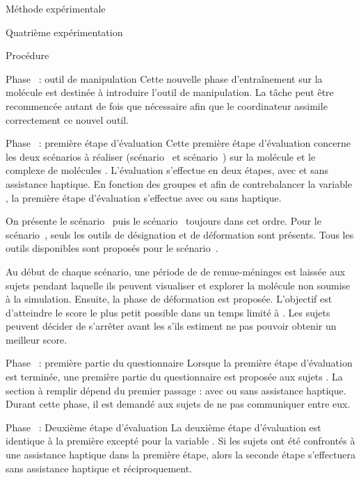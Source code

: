 \documentclass[myfrancais]{mythesis}
\begin{document}
\begin{mychapter}{Méthode expérimentale}
\begin{mysection}{Quatrième expérimentation}
\begin{mysubsection}{Procédure}
\begin{myparagraph}{Phase~ : outil de manipulation}
					Cette nouvelle phase d'entraînement sur la molécule \myTRPZIPPER est destinée à introduire l'outil de manipulation.
					La tâche peut être recommencée autant de fois que nécessaire afin que le coordinateur assimile correctement ce nouvel outil.
				\end{myparagraph}
				\begin{myparagraph}{Phase~ : première étape d'évaluation}
					Cette première étape d'évaluation concerne les deux scénarios à réaliser (scénario~ et scénario~) sur la molécule \myUbiquitin et le complexe de molécules \myNusENusG.
					L'évaluation s'effectue en deux étapes, avec et sans assistance haptique.
					En fonction des groupes et afin de contrebalancer la variable , la première étape d'évaluation s'effectue avec ou sans haptique.

					On présente le scénario~ puis le scénario~ toujours dans cet ordre.
					Pour le scénario~, seuls les outils de désignation et de déformation sont présents.
					Tous les outils disponibles sont proposés pour le scénario~.

					Au début de chaque scénario, une période de  de remue-méninges est laissée aux sujets pendant laquelle ils peuvent visualiser et explorer la molécule non soumise à la simulation.
					Ensuite, la phase de déformation est proposée.
					L'objectif est d'atteindre le score  le plus petit possible dans un temps limité à .
					Les sujets peuvent décider de s'arrêter avant les  s'ils estiment ne pas pouvoir obtenir un meilleur score.
				\end{myparagraph}
				\begin{myparagraph}{Phase~ : première partie du questionnaire}
					Lorsque la première étape d'évaluation est terminée, une première partie du questionnaire est proposée aux sujets .
					La section à remplir dépend du premier passage : avec ou sans assistance haptique.
					Durant cette phase, il est demandé aux sujets de ne pas communiquer entre eux.
				\end{myparagraph}
				\begin{myparagraph}{Phase~ : Deuxième étape d'évaluation}
					La deuxième étape d'évaluation est identique à la première excepté pour la variable .
					Si les sujets ont été confrontés à une assistance haptique dans la première étape, alors la seconde étape s'effectuera sans assistance haptique et réciproquement.


\end{myparagraph}
\end{mysubsection}
\end{mysection}
\end{mychapter}
\end{document}
